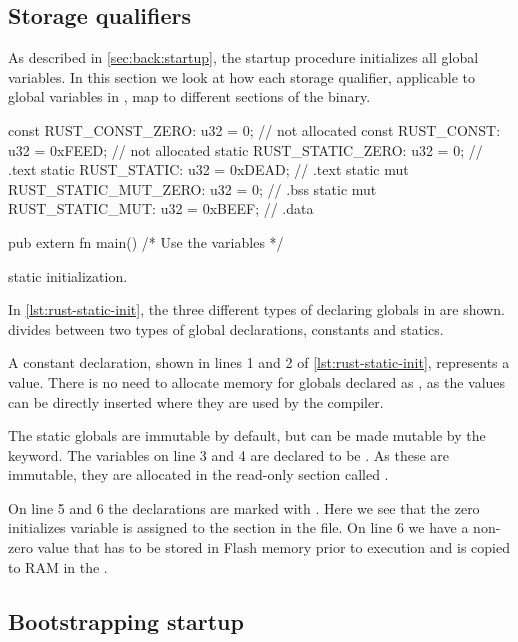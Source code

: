 \subsection{Storage qualifiers}

As described in \autoref{sec:back:startup}, the startup procedure initializes all global variables.
In this section we look at how each storage qualifier,  applicable to global variables in {\rust}, map to different sections of the {\elf} binary.

\begin{listing}[H]
\begin{rustcode}
const      RUST_CONST_ZERO: u32 = 0;      // not allocated
const      RUST_CONST: u32 = 0xFEED;      // not allocated
static     RUST_STATIC_ZERO: u32 = 0;     // .text
static     RUST_STATIC: u32 = 0xDEAD;     // .text
static mut RUST_STATIC_MUT_ZERO: u32 = 0; // .bss
static mut RUST_STATIC_MUT: u32 = 0xBEEF; // .data

pub extern fn main() { /* Use the variables */ }
\end{rustcode}
\caption{{\rust} static initialization.}
\label{lst:rust-static-init}
\end{listing}

In \autoref{lst:rust-static-init}, the three different types of declaring globals in {\rust} are shown.
{\rust} divides between two types of global declarations, constants and statics.

A constant declaration, shown in lines 1 and 2 of \autoref{lst:rust-static-init}, represents a value.
There is no need to allocate memory for globals declared as , as the values can be directly inserted where they are used by the compiler.

The static globals are immutable by default, but can be made mutable by the  keyword.
The variables on line 3 and 4 are declared to be .
As these are immutable, they are allocated in the read-only section called .

On line 5 and 6 the declarations are marked with .
Here we see that the zero initializes variable is assigned to the  section in the {\elf} file.
On line 6 we have a non-zero value that has to be stored in Flash memory prior to execution and is copied to RAM in the .

\subsection{Bootstrapping startup}
\label{sec:startup}

